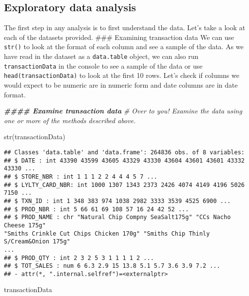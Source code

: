 \documentclass[
]{article}
\newenvironment{Shaded}{\begin{snugshade}}{\end{snugshade}}
\newcommand{\CommentTok}[1]{\textcolor[rgb]{0.56,0.35,0.01}{\textit{#1}}}
\newcommand{\DocumentationTok}[1]{\textcolor[rgb]{0.56,0.35,0.01}{\textbf{\textit{#1}}}}
\newcommand{\FunctionTok}[1]{\textcolor[rgb]{0.00,0.00,0.00}{#1}}
\newcommand{\NormalTok}[1]{#1}
\begin{document}
\hypertarget{exploratory-data-analysis}{%
\subsection{Exploratory data analysis}\label{exploratory-data-analysis}}

The first step in any analysis is to first understand the data. Let's
take a look at each of the datasets provided. \#\#\# Examining
transaction data We can use \texttt{str()} to look at the format of each
column and see a sample of the data. As we have read in the dataset as a
\texttt{data.table} object, we can also run \texttt{transactionData} in
the console to see a sample of the data or use
\texttt{head(transactionData)} to look at the first 10 rows. Let's check
if columns we would expect to be numeric are in numeric form and date
columns are in date format.

\begin{Shaded}
\begin{Highlighting}[]
\DocumentationTok{\#\#\#\# Examine transaction data}
\CommentTok{\# Over to you! Examine the data using one or more of the methods described above.}

\FunctionTok{str}\NormalTok{(transactionData)}
\end{Highlighting}
\end{Shaded}

\begin{verbatim}
## Classes 'data.table' and 'data.frame': 264836 obs. of 8 variables:
## $ DATE : int 43390 43599 43605 43329 43330 43604 43601 43601 43332 43330 ...
## $ STORE_NBR : int 1 1 1 2 2 4 4 4 5 7 ...
## $ LYLTY_CARD_NBR: int 1000 1307 1343 2373 2426 4074 4149 4196 5026 7150 ...
## $ TXN_ID : int 1 348 383 974 1038 2982 3333 3539 4525 6900 ...
## $ PROD_NBR : int 5 66 61 69 108 57 16 24 42 52 ...
## $ PROD_NAME : chr "Natural Chip Compny SeaSalt175g" "CCs Nacho Cheese 175g"
"Smiths Crinkle Cut Chips Chicken 170g" "Smiths Chip Thinly S/Cream&Onion 175g"
...
## $ PROD_QTY : int 2 3 2 5 3 1 1 1 1 2 ...
## $ TOT_SALES : num 6 6.3 2.9 15 13.8 5.1 5.7 3.6 3.9 7.2 ...
## - attr(*, ".internal.selfref")=<externalptr>
\end{verbatim}

\begin{Shaded}
\begin{Highlighting}[]
\NormalTok{transactionData}
\end{Highlighting}
\end{Shaded}
\end{document}
